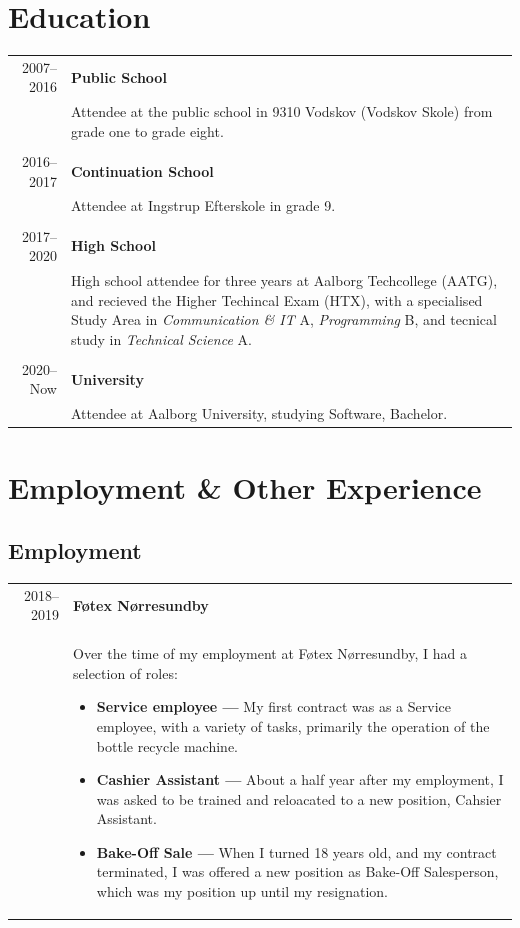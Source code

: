 \documentclass{article}
\begin{document}
    \section*{Education}
    \begin{tabular}{r|p{.82\linewidth}} 
        2007--2016 & \textbf{Public School}\\
    &   Attendee at the public school in 9310 Vodskov (Vodskov Skole) from grade one to grade eight.
        \\\\
        2016--2017 & \textbf{Continuation School}\\
    &   Attendee at Ingstrup Efterskole in grade 9.
        \\\\
        2017--2020 & \textbf{High School}\\
    &   High school attendee for three years at Aalborg Techcollege (AATG), and recieved the Higher
            Techincal Exam (HTX), with a specialised Study Area in \textit{Communication \& IT} A,
            \textit{Programming} B, and tecnical study in \textit{Technical Science} A.
        \\\\
        2020--Now & \textbf{University}\\
    &   Attendee at Aalborg University, studying Software, Bachelor.
    \end{tabular}
 
    \section*{Employment \& Other Experience}
    \subsection*{Employment}
    \begin{tabular}{r|p{.82\linewidth}}%
        2018--2019 & \textbf{Føtex Nørresundby}\\
    &   Over the time of my employment at Føtex Nørresundby, I had a selection of roles:
        \begin{itemize}\setlength\itemsep{0em}
            \item[] \textbf{Service employee --- } My first contract was as a Service employee,
                with a variety of tasks, primarily the operation of the bottle recycle machine.
            \item[] \textbf{Cashier Assistant --- } About a half year after my employment,
                I was asked to be trained and reloacated to a new position, Cahsier Assistant.
            \item[] \textbf{Bake-Off Sale --- } When I turned 18 years old, and my contract
                terminated, I was offered a new position as Bake-Off Salesperson, which was my
                position up until my resignation.

        \end{itemize}
    \end{tabular}
\end{document}
